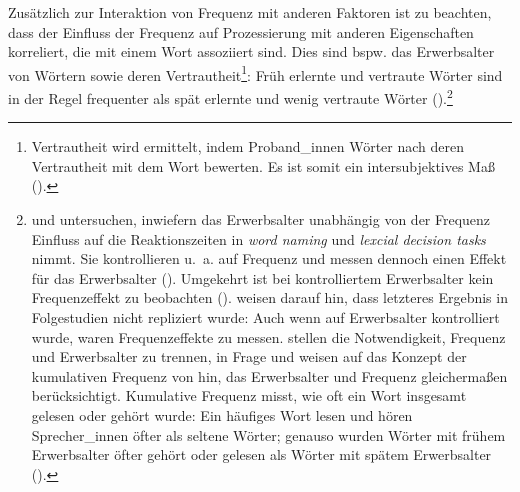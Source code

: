 Zusätzlich zur Interaktion von Frequenz mit anderen Faktoren ist zu beachten, dass der Einfluss der Frequenz auf Prozessierung  mit anderen Eigenschaften korreliert, die mit einem Wort assoziiert sind. Dies sind bspw. das Erwerbsalter von Wörtern sowie deren Vertrautheit\footnote{Vertrautheit wird ermittelt, indem Proband\_innen Wörter nach deren Vertrautheit mit dem Wort bewerten. Es ist somit ein intersubjektives Maß (\cites[261]{Gernsbacher.1984}[298]{McDonald.2001}).}: Früh erlernte und vertraute Wörter sind in der Regel frequenter als spät erlernte und wenig vertraute Wörter (\cites{Gernsbacher.1984}[298--299]{McDonald.2001}).\footnote{\textcite{Morrison.1995} und \textcite{Morrison.2000} untersuchen, inwiefern das Erwerbsalter unabhängig von der Frequenz Einfluss auf die Reaktionszeiten in \textit{word naming} und \textit{lexcial decision tasks} nimmt. Sie kontrollieren u.~a. auf  Frequenz und messen dennoch einen Effekt für das Erwerbsalter (\cites[120--121]{Morrison.1995}[176]{Morrison.2000}). Umgekehrt ist bei kontrolliertem Erwerbsalter kein Frequenzeffekt zu beobachten (\cite[120--121]{Morrison.1995}). \textcite[4--10]{Zevin.2002} weisen darauf hin, dass letzteres Ergebnis in Folgestudien nicht repliziert wurde: Auch wenn auf Erwerbsalter kontrolliert wurde, waren Frequenzeffekte zu messen. \textcite[298]{McDonald.2001} stellen die Notwendigkeit, Frequenz und Erwerbsalter zu trennen, in Frage und weisen auf das Konzept der kumulativen Frequenz von \textcite{Lewis.2001} hin, das Erwerbsalter und Frequenz gleichermaßen berücksichtigt. Kumulative Frequenz misst, wie oft ein Wort insgesamt gelesen oder gehört wurde: Ein häufiges Wort lesen und hören Sprecher\_innen öfter als seltene Wörter; genauso wurden Wörter mit frühem Erwerbsalter öfter gehört oder gelesen als Wörter mit spätem Erwerbsalter (\cite[191]{Lewis.2001}).}      
